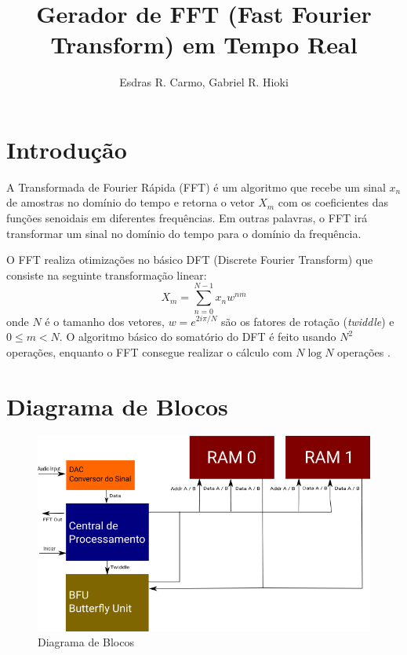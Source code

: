 \documentclass{article}
\newcommand{\tit}[1]{\textit{#1}}
\begin{document}
\title{Gerador de FFT (Fast Fourier Transform) em Tempo Real}
\author{Esdras R. Carmo, Gabriel R. Hioki}

\maketitle
\newpage
\tableofcontents
\newpage

\section{Introdução}
A Transformada de Fourier Rápida (FFT) é um algoritmo que recebe um sinal
$x_n$ de amostras no domínio do tempo e retorna o vetor $X_m$ com os coeficientes
das funções senoidais em diferentes frequências. Em outras palavras, o FFT irá 
transformar um sinal no domínio do tempo para o domínio da frequência.

O FFT realiza otimizações no básico DFT (Discrete Fourier Transform) que consiste na seguinte
transformação linear:
$$
    X_m = \sum_{n=0}^{N-1}x_n w^{nm}
$$
onde $N$ é o tamanho dos vetores, $w = e^{2i\pi/N}$ são os fatores de rotação (\tit{twiddle}) e
$0 \leq m < N$. O algoritmo básico do somatório do DFT é feito usando $N^2$ operações, enquanto
o FFT consegue realizar o cálculo com $N \log N$ operações \cite{fft-hardware}.

\section{Diagrama de Blocos}

\begin{figure}[h!]
  \includegraphics[width=\linewidth]{img/block-diagram.png}
  \caption{Diagrama de Blocos}
  \label{fig:diag}
\end{figure}
\end{document}
